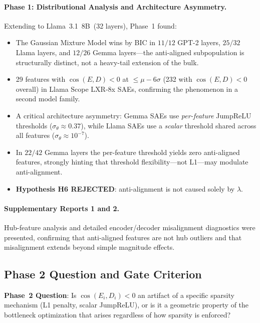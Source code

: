 \documentclass[11pt,a4paper]{article}
\newcommand{\cosED}{\cos(E_i, D_i)}
\begin{document}
\paragraph{Phase 1: Distributional Analysis and Architecture Asymmetry.}
Extending to Llama~3.1~8B~(32 layers), Phase~1 found:
\begin{itemize}[noitemsep]
  \item The Gaussian Mixture Model wins by BIC in $11/12$ GPT-2 layers, $25/32$ Llama
        layers, and $12/26$ Gemma layers---the anti-aligned subpopulation is structurally
        distinct, not a heavy-tail extension of the bulk.
  \item 29 features with $\cos(E,D)<0$ at $\leq\mu-6\sigma$ (232 with $\cos(E,D)<0$ overall)
        in Llama Scope LXR-8x SAEs, confirming the phenomenon in a second model family.
  \item A critical architecture asymmetry: Gemma SAEs use \emph{per-feature} JumpReLU
        thresholds ($\sigma_{\theta}\approx 0.37$), while Llama SAEs use a \emph{scalar}
        threshold shared across all features ($\sigma_{\theta} \approx 10^{-7}$).
  \item In $22/42$ Gemma layers the per-feature threshold yields zero anti-aligned features,
        strongly hinting that threshold flexibility---not L1---may modulate anti-alignment.
  \item \textbf{Hypothesis H6 REJECTED}: anti-alignment is not caused solely by $\lambda$.
\end{itemize}

\paragraph{Supplementary Reports 1 and 2.}
Hub-feature analysis and detailed encoder/decoder misalignment diagnostics were presented,
confirming that anti-aligned features are not hub outliers and that misalignment extends
beyond simple magnitude effects.

\subsection{Phase 2 Question and Gate Criterion}

\begin{keyinsight}
\textbf{Phase~2 Question}: Is $\cosED < 0$ an artifact of a specific sparsity mechanism
(L1 penalty, scalar JumpReLU), or is it a geometric property of the bottleneck optimization
that arises regardless of how sparsity is enforced?
\end{keyinsight}
\end{document}
